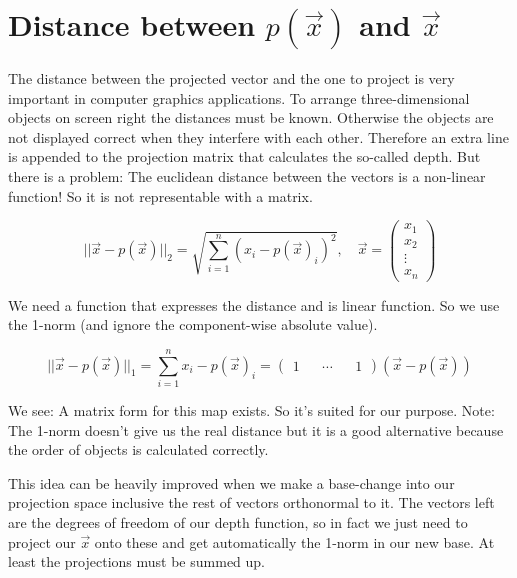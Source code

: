 \documentclass{article}
\begin{document}
\section{Distance between \(p(\vec{x})\) and \(\vec{x}\)}

The distance between the projected vector and the one to project is very
important in computer graphics applications. To arrange three-dimensional
objects on screen right the distances must be known. Otherwise the objects are
not displayed correct when they interfere with each other. Therefore an extra
line is appended to the projection matrix that calculates the so-called depth.
But there is a problem: The euclidean distance between the vectors is a
non-linear function! So it is not representable with a matrix.

    \begin{equation}
        ||\vec{x} - p(\vec{x})||_2 = \sqrt{\sum_{i=1}^{n}{
        (x_i - p(\vec{x})_i)^2}}, \quad \vec{x} =
        \begin{pmatrix}
            x_1 \\
            x_2 \\
            \vdots \\
            x_n
        \end{pmatrix}
    \end{equation}

We need a function that expresses the distance and is linear function. So we use
the 1-norm (and ignore the component-wise absolute value).

    \begin{equation}
        ||\vec{x} - p(\vec{x})||_1 = \sum_{i=1}^{n}{x_i - p(\vec{x})_i} =
        \begin{pmatrix} 1 && \cdots && 1 \end{pmatrix} (\vec{x} - p(\vec{x}))
    \end{equation}

We see: A matrix form for this map exists. So it's suited for our purpose.
Note: The 1-norm doesn't give us the real distance but it is a good alternative
because the order of objects is calculated correctly.

This idea can be heavily improved when we make a base-change into our projection
space inclusive the rest of vectors orthonormal to it. The vectors left are the
degrees of freedom of our depth function, so in fact we just need to project our
\(\vec{x}\) onto these and get automatically the 1-norm in our new base. At
least the projections must be summed up.
\end{document}
